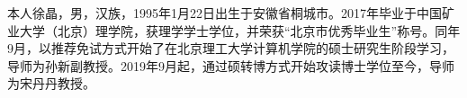 
\begin{resume}

本人徐晶，男，汉族，1995年1月22日出生于安徽省桐城市。2017年毕业于中国矿业大学（北京）理学院，获理学学士学位，并荣获“北京市优秀毕业生”称号。同年9月，以推荐免试方式开始了在北京理工大学计算机学院的硕士研究生阶段学习，导师为孙新副教授。2019年9月起，通过硕转博方式开始攻读博士学位至今，导师为宋丹丹教授。

\end{resume}
